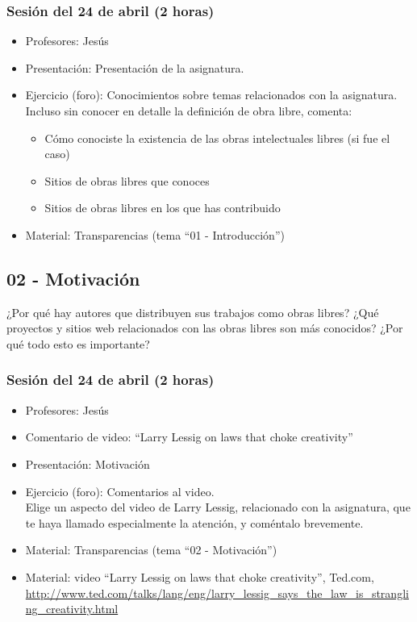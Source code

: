 \documentclass[a4paper,12pt]{article}
\begin{document}
\subsubsection{Sesión del 24 de abril (2 horas)}

 \begin{itemize}
 \item Profesores: Jesús
 \item Presentación: Presentación de la asignatura.
 \item Ejercicio (foro): Conocimientos sobre temas relacionados con la asignatura. \\
   Incluso sin conocer en detalle la definición de obra libre, comenta:
   \begin{itemize}
   \item Cómo conociste la existencia de las obras intelectuales libres (si fue el caso)
   \item Sitios de obras libres que conoces
   \item Sitios de obras libres en los que has contribuido
   \end{itemize}
 \item Material: Transparencias (tema ``01 - Introducción'')
 \end{itemize}

\subsection{02 - Motivación}

¿Por qué hay autores que distribuyen sus trabajos como obras libres? ¿Qué proyectos y sitios web relacionados con las obras libres son más conocidos? ¿Por qué todo esto es importante?

\subsubsection{Sesión del 24 de abril (2 horas)}

 \begin{itemize}
 \item Profesores: Jesús
 \item Comentario de video: ``Larry Lessig on laws that choke creativity''
 \item Presentación: Motivación
 \item Ejercicio (foro): Comentarios al video. \\
   Elige un aspecto del video de Larry Lessig, relacionado con la asignatura, que te haya llamado especialmente la atención, y coméntalo brevemente.
 \item Material: Transparencias (tema ``02 - Motivación'')
 \item Material: video ``Larry Lessig on laws that choke creativity'', Ted.com, \\
   \url{http://www.ted.com/talks/lang/eng/larry_lessig_says_the_law_is_strangling_creativity.html}
 \end{itemize}
\end{document}
